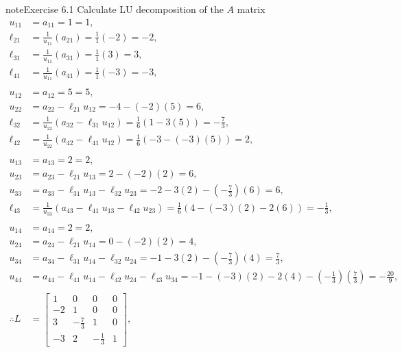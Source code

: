 \documentclass[letterpaper,10pt,english]{jupyterBook}
\begin{document}
\begin{sphinxadmonition}{note}{Exercise 6.1}
\sphinxAtStartPar
Calculate LU decomposition of the \(A\) matrix
\begin{align*}
    u_{11} &= a_{11} = 1 = 1, \\
    \ell_{21} &= \frac{1}{u_{11}}\left(a_{21}\right) = \frac{1}{1}\left(-2\right) = -2, \\
    \ell_{31} &= \frac{1}{u_{11}}\left(a_{31}\right) = \frac{1}{1}\left(3\right) = 3, \\
    \ell_{41} &= \frac{1}{u_{11}}\left(a_{41}\right) = \frac{1}{1}\left(-3\right) = -3, \\
    \\
    u_{12} &= a_{12} = 5 = 5, \\
    u_{22} &= a_{22} - \ell_{21} u_{12} = -4 - \left(-2\right)\left(5\right) = 6, \\
    \ell_{32} &= \frac{1}{u_{22}}\left(a_{32} - \ell_{31} u_{12}\right) = \frac{1}{6}\left(1 - 3\left(5\right)\right) = - \frac{7}{3}, \\
    \ell_{42} &= \frac{1}{u_{22}}\left(a_{42} - \ell_{41} u_{12}\right) = \frac{1}{6}\left(-3 - \left(-3\right)\left(5\right)\right) = 2, \\
    \\
    u_{13} &= a_{13} = 2 = 2, \\
    u_{23} &= a_{23} - \ell_{21} u_{13} = 2 - \left(-2\right)\left(2\right) = 6, \\
    u_{33} &= a_{33} - \ell_{31} u_{13} - \ell_{32} u_{23} = -2 - 3\left(2\right) - \left(- \frac{7}{3}\right)\left(6\right) = 6, \\
    \ell_{43} &= \frac{1}{u_{33}}\left(a_{43} - \ell_{41} u_{13} - \ell_{42} u_{23}\right) = \frac{1}{6}\left(4 - \left(-3\right)\left(2\right) - 2\left(6\right)\right) = - \frac{1}{3}, \\
    \\
    u_{14} &= a_{14} = 2 = 2, \\
    u_{24} &= a_{24} - \ell_{21} u_{14} = 0 - \left(-2\right)\left(2\right) = 4, \\
    u_{34} &= a_{34} - \ell_{31} u_{14} - \ell_{32} u_{24} = -1 - 3\left(2\right) - \left(- \frac{7}{3}\right)\left(4\right) = \frac{7}{3}, \\
    u_{44} &= a_{44} - \ell_{41} u_{14} - \ell_{42} u_{24} - \ell_{43} u_{34} = -1 - \left(-3\right)\left(2\right) - 2\left(4\right) - \left(- \frac{1}{3}\right)\left(\frac{7}{3}\right) = - \frac{20}{9}, \\
    \\
    \therefore L &= \left[\begin{matrix}1 & 0 & 0 & 0\\-2 & 1 & 0 & 0\\3 & - \frac{7}{3} & 1 & 0\\-3 & 2 & - \frac{1}{3} & 1\end{matrix}\right], \qquad

\end{align*}
\end{sphinxadmonition}
\end{document}
